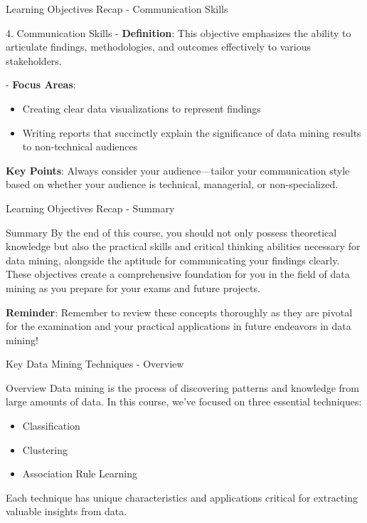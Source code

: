 \documentclass[aspectratio=169]{beamer}
\begin{document}
\begin{frame}[fragile]{Learning Objectives Recap - Communication Skills}
    \begin{block}{4. Communication Skills}
        - \textbf{Definition}: This objective emphasizes the ability to articulate findings, methodologies, and outcomes effectively to various stakeholders.

        - \textbf{Focus Areas}:  
        \begin{itemize}
            \item Creating clear data visualizations to represent findings 
            \item Writing reports that succinctly explain the significance of data mining results to non-technical audiences
        \end{itemize}

        \textbf{Key Points}: Always consider your audience—tailor your communication style based on whether your audience is technical, managerial, or non-specialized.
    \end{block}
\end{frame}

\begin{frame}[fragile]{Learning Objectives Recap - Summary}
    \begin{block}{Summary}
        By the end of this course, you should not only possess theoretical knowledge but also the practical skills and critical thinking abilities necessary for data mining, alongside the aptitude for communicating your findings clearly. These objectives create a comprehensive foundation for you in the field of data mining as you prepare for your exams and future projects.
        
        \textbf{Reminder}: Remember to review these concepts thoroughly as they are pivotal for the examination and your practical applications in future endeavors in data mining!
    \end{block}
\end{frame}

\begin{frame}[fragile]{Key Data Mining Techniques - Overview}
    \begin{block}{Overview}
        Data mining is the process of discovering patterns and knowledge from large amounts of data. In this course, we've focused on three essential techniques:
        \begin{itemize}
            \item Classification
            \item Clustering
            \item Association Rule Learning
        \end{itemize}
        Each technique has unique characteristics and applications critical for extracting valuable insights from data.
    \end{block}
\end{frame}
\end{document}
